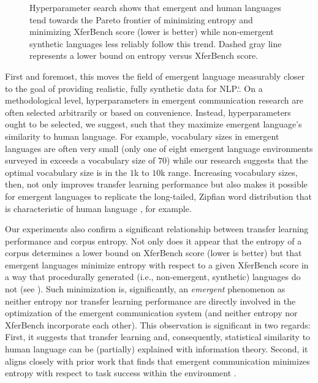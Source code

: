 \begin{figure}
  \centering
  \caption{Hyperparameter search shows that emergent and human languages tend towards the Pareto frontier of minimizing entropy and minimizing XferBench score (lower is better) while non-emergent synthetic languages less reliably follow this trend.  Dashed gray line represents a lower bound on entropy versus XferBench score.}
  \unskip\label{hpo:fig:ent-xb}
\end{figure}

First and foremost, this moves the field of emergent language measurably closer to the goal of providing realistic, fully synthetic data for NLP.\spacefactor\sfcode`.{}
On a methodological level, hyperparameters in emergent communication research are often selected arbitrarily or based on convenience.
Instead, hyperparameters ought to be selected, we suggest, such that they maximize emergent language's similarity to human language.
For example, vocabulary sizes in emergent languages are often very small (only one of eight emergent language environments surveyed in \citet{elcc} exceeds a vocabulary size of $70$) while our research suggests that the optimal vocabulary size is in the $1$k to $10$k range.
Increasing vocabulary sizes, then, not only improves transfer learning performance but also makes it possible for emergent languages to replicate the long-tailed, Zipfian word distribution that is characteristic of human language \citep{zipf1949least,piantadosi2014zipf}, for example.

Our experiments also confirm a significant relationship between transfer learning performance and corpus entropy.
Not only does it appear that the entropy of a corpus determines a lower bound on XferBench score (lower is better) but that emergent languages minimize entropy with respect to a given XferBench score in a way that procedurally generated (i.e., non-emergent, synthetic) languages do not (see ).
Such minimization is, significantly, an \emph{emergent} phenomenon as neither entropy nor transfer learning performance are directly involved in the optimization of the emergent communication system (and neither entropy nor XferBench incorporate each other).
This observation is significant in two regards:
  First, it suggests that transfer learning and, consequently, statistical similarity to human language can be (partially) explained with information theory.
  Second, it aligns closely with prior work that finds that emergent communication minimizes entropy with respect to task success within the environment \citep{kharitonov2020entmin,chaabouni2022emergent}.

